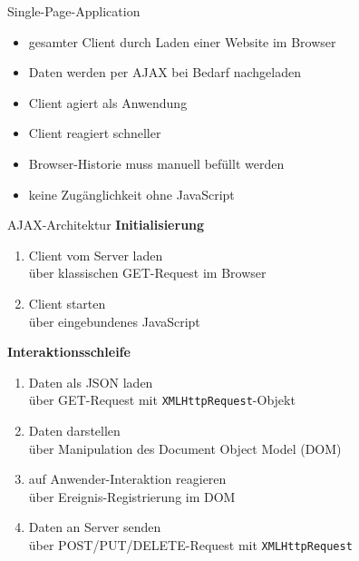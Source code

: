 \begin{frame}{Single-Page-Application}
  \begin{itemize}
    \item gesamter Client durch Laden einer Website im Browser
    \item Daten werden per AJAX bei Bedarf nachgeladen\\[2ex]
    \item[\goodmark] Client agiert als Anwendung
    \item[\goodmark] Client reagiert schneller\\[2ex]
    \item[\badmark] Browser-Historie muss manuell befüllt werden
    \item[\badmark] keine Zugänglichkeit ohne JavaScript
    \end{itemize}
\end{frame}

\begin{frame}{AJAX-Architektur}{}
  {\color{maincolor}\bfseries Initialisierung}
  \begin{enumerate}
    \item Client vom Server laden 
      {\scriptsize\\\color{gray} über klassischen GET-Request im Browser\\[2ex]}
    \item Client starten 
      {\scriptsize\\\color{gray} über eingebundenes JavaScript\\[2ex]}
  \end{enumerate}    
  
  \vfill
  
  {\color{maincolor}\bfseries Interaktionsschleife}
  \begin{enumerate}
    \item Daten als JSON laden 
      {\scriptsize\\\color{gray} über GET-Request mit \texttt{XMLHttpRequest}-Objekt\\[2ex]}
    \item Daten darstellen 
      {\scriptsize\\\color{gray} über Manipulation des Document Object Model (DOM)\\[2ex]}
    \item auf Anwender-Interaktion reagieren 
      {\scriptsize\\\color{gray} über Ereignis-Registrierung im DOM\\[2ex]}
    \item Daten an Server senden
      {\scriptsize\\\color{gray} über POST/PUT/DELETE-Request mit \texttt{XMLHttpRequest}\\[2ex]}
  \end{enumerate}
\end{frame}

